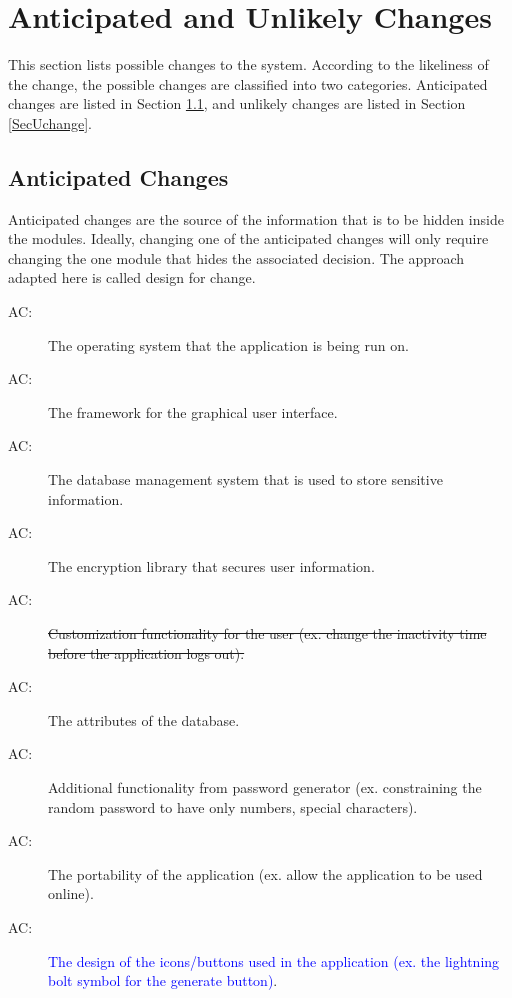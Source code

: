 \documentclass[12pt, titlepage]{article}
\newcounter{acnum}
\newcommand{\actheacnum}{AC\theacnum}
\begin{document}
\section{Anticipated and Unlikely Changes} \label{SecChange}

This section lists possible changes to the system. According to the likeliness
of the change, the possible changes are classified into two
categories. Anticipated changes are listed in Section \ref{SecAchange}, and
unlikely changes are listed in Section \ref{SecUchange}.

\subsection{Anticipated Changes} \label{SecAchange}

Anticipated changes are the source of the information that is to be hidden
inside the modules. Ideally, changing one of the anticipated changes will only
require changing the one module that hides the associated decision. The approach
adapted here is called design for change.

\begin{description}
  \item[ \actheacnum \label{acInput}:] The operating system
  that the application is being run on.
  \item[ \actheacnum \label{acFramework}:] The framework for
  the graphical user interface.
  \item[ \actheacnum \label{acDatabase}:] The database management system that is used to store sensitive information.
  \item[ \actheacnum \label{acEncryption}:] The encryption library that secures user information.
  \item[ \actheacnum \label{acUserCustom}:] \sout{Customization functionality for the user (ex. change the inactivity time before the application logs out).}
  \item[ \actheacnum \label{acDBAttributes}:] The attributes of the database.
  \item[ \actheacnum \label{acPassGenFunc}:] Additional functionality from password generator (ex. constraining the random password to have only numbers, special characters).
  \item[ \actheacnum \label{acPortability}:] The portability of the application (ex. allow the application to be used online).
  \item[ \actheacnum \label{acUnderstand}:] \textcolor{blue}{The design of the icons/buttons used in the application (ex. the lightning bolt symbol for the generate button)}.
\end{description}
\end{document}
